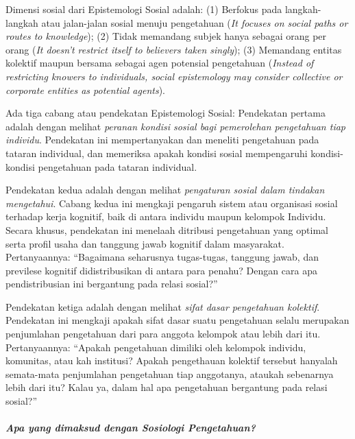 \documentclass[10pt,a4paper]{article}
\begin{document}
\begin{multicols}{2}
Dimensi sosial dari Epistemologi Sosial adalah: (1) Berfokus pada
langkah-langkah atau jalan-jalan sosial menuju pengetahuan (\emph{It
focuses on social paths or routes to knowledge}); (2) Tidak memandang
subjek hanya sebagai orang per orang (\emph{It doesn't restrict itself
to believers taken singly}); (3) Memandang entitas kolektif maupun
bersama sebagai agen potensial pengetahuan (\emph{Instead of restricting
knowers to individuals, social epistemology may consider collective or
corporate entities as potential agents}).

Ada tiga cabang atau pendekatan Epistemologi Sosial: Pendekatan pertama
adalah dengan melihat \emph{peranan kondisi sosial bagi pemerolehan
pengetahuan tiap individu}. Pendekatan ini mempertanyakan dan meneliti
pengetahuan pada tataran individual, dan memeriksa apakah kondisi sosial
mempengaruhi kondisi-kondisi pengetahuan pada tataran individual.

Pendekatan kedua adalah dengan melihat \emph{pengaturan sosial dalam
tindakan mengetahui}. Cabang kedua ini mengkaji pengaruh sistem atau
organisasi sosial terhadap kerja kognitif, baik di antara individu
maupun kelompok Individu. Secara khusus, pendekatan ini menelaah
ditribusi pengetahuan yang optimal serta profil usaha dan tanggung jawab
kognitif dalam masyarakat. Pertanyaannya: ``Bagaimana seharusnya
tugas-tugas, tanggung jawab, dan previlese kognitif didistribusikan di
antara para penahu? Dengan cara apa pendistribusian ini bergantung pada
relasi sosial?''

Pendekatan ketiga adalah dengan melihat \emph{sifat dasar pengetahuan
kolektif}. Pendekatan ini mengkaji apakah sifat dasar suatu pengetahuan
selalu merupakan penjumlahan pengetahuan dari para anggota kelompok atau
lebih dari itu. Pertanyaannya: ``Apakah pengetahuan dimiliki oleh
kelompok individu, komunitas, atau kah institusi? Apakah pengethauan
kolektif tersebut hanyalah semata-mata penjumlahan pengetahuan tiap
anggotanya, ataukah sebenarnya lebih dari itu? Kalau ya, dalam hal apa
pengetahuan bergantung pada relasi sosial?''

\hypertarget{apa-yang-dimaksud-dengan-sosiologi-pengetahuan}{%
\paragraph{\texorpdfstring{\emph{Apa yang dimaksud dengan Sosiologi
Pengetahuan?}}{Apa yang dimaksud dengan Sosiologi Pengetahuan?}}\label{apa-yang-dimaksud-dengan-sosiologi-pengetahuan}}


\end{multicols}
\end{document}
